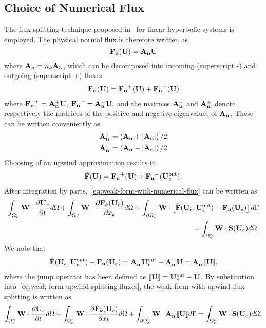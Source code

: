 \subsection{Choice of Numerical Flux}
The flux splitting technique proposed in~\cite{donea2003finite} for linear hyperbolic systems is employed.
The physical normal flux is therefore written as
$$
\mathbf{\mathbf{F}_n}(\mathbf{U}) = \mathbf{A}_\mathbf{n} \mathbf{U}
$$
where $\mathbf{A}_\mathbf{n} = n_{k} \mathbf{A}_\mathbf{k}$, which can be decomposed into incoming
(superscript -) and outgoing (superscript +) fluxes
\begin{align}
\mathbf{\mathbf{F}_n}(\mathbf{U}) = \mathbf{\mathbf{F}_n}^+(\mathbf{U}) + \mathbf{\mathbf{F}_n}^-(\mathbf{U})
\label{eq:phys-flux-splitting}
\end{align}
where $ \mathbf{\mathbf{F}_n}^+ = \mathbf{A}_\mathbf{n}^{+} \mathbf{U}$, $\mathbf{\mathbf{F}_n}^- = \mathbf{A}_\mathbf{n}^{-} \mathbf{U}, $ and the matrices $\mathbf{A}_\mathbf{n}^{-}$ and $\mathbf{A}_\mathbf{n}^{+}$ denote respectively the matrices of the positive and negative eigenvalues of $\mathbf{A}_\mathbf{n}$. These can be written conveniently as
\begin{align}
  \label{eq:AnMinus-AnPlus-Definition}
\mathbf{A}_\mathbf{n}^{+} &= \left( \mathbf{A}_\mathbf{n} + \left| \mathbf{A}_\mathbf{n} \right| \right) / 2   \\
\mathbf{A}_\mathbf{n}^{-} &= \left( \mathbf{A}_\mathbf{n} - \left| \mathbf{A}_\mathbf{n} \right| \right) / 2
\end{align}
Choosing of an upwind approximation\cite{chen2005high} results in
\begin{align}
\tilde{\mathbf{F}}(\mathbf{U}) = \mathbf{\mathbf{F}_n}^+(\mathbf{U}) + \mathbf{\mathbf{F}_n}^-(\mathbf{U}_e^{\textrm{out}}).
\label{eq:num-flux-splitting}
\end{align}
After integration by parts,~\eqref{eq:weak-form-with-numerical-flux} can be written as
\begin{align*}
\int_{\Omega_e^{n}} \mathbf{W} \cdot \frac{\partial \mathbf{U}_e}{\partial t} d\Omega  + \int_{\Omega_e^{n}} \mathbf{W} \cdot \frac{\partial \mathbf{F}_{k}(\mathbf{U}_e)}{\partial x_{k}} d\Omega + \int_{\partial \Omega_e^{n}} \mathbf{W} \cdot \left[ \tilde{\mathbf{F}}(\mathbf{U}_e,\mathbf{U}_e^{\textrm{out}}) - \mathbf{\mathbf{F}_n}(\mathbf{U}_e) \right] d\Gamma \\
= \int_{\Omega_e^{n}} \mathbf{W}  \cdot \mathbf{S}(\mathbf{U}_e) d\Omega, \label{eq:weak-form-upwind-splitting-fluxes}
\end{align*}
We note that %
\begin{align}
  \tilde{\mathbf{F}}(\mathbf{U}_e,\mathbf{U}_e^{\textrm{out}}) - \mathbf{\mathbf{F}_n}(\mathbf{U}_e) = \mathbf{A}_\mathbf{n}^{-} \mathbf{U}_e^{\textrm{out}} - \mathbf{A}_\mathbf{n}^{-} \mathbf{U} = \mathbf{A}_\mathbf{n}^{-} \llbracket \mathbf{U} \rrbracket, \label{eq:AnMinusUderivation}
\end{align}
where the jump operator has been defined as $\llbracket \mathbf{U} \rrbracket = \mathbf{U}_e^{\textrm{out}} - \mathbf{U}$. By substitution into~\eqref{eq:weak-form-upwind-splitting-fluxes}, the weak form with upwind flux splitting is written as
\begin{equation}
\int_{\Omega_e^{n}} \mathbf{W} \cdot \frac{\partial \mathbf{U}_e}{\partial t} d\Omega  + \int_{\Omega_e^{n}} \mathbf{W} \cdot \frac{\partial \mathbf{F}_{k}(\mathbf{U}_e)}{\partial x_{k}} d\Omega + \int_{\partial \Omega_e^{n}} \mathbf{W} \cdot \mathbf{A}_\mathbf{n}^{-} \llbracket \mathbf{U} \rrbracket d\Gamma = \int_{\Omega_e^{n}} \mathbf{W}  \cdot \mathbf{S}(\mathbf{U}_e) d\Omega,
\label{eq:weak-form-final}
\end{equation}

